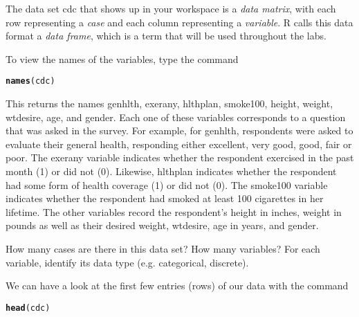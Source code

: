 \documentclass{article}\usepackage[]{graphicx}\usepackage[]{color}
\makeatletter
\newcommand{\hlstd}[1]{\textcolor[rgb]{0.345,0.345,0.345}{#1}}%
\newcommand{\hlkwd}[1]{\textcolor[rgb]{0.737,0.353,0.396}{\textbf{#1}}}%
\newenvironment{kframe}{%
 \def\at@end@of@kframe{}%
 \ifinner\ifhmode%
  \def\at@end@of@kframe{\end{minipage}}%
  \begin{minipage}{\columnwidth}%
 \fi\fi%
 \def\FrameCommand##1{\hskip\@totalleftmargin \hskip-\fboxsep
 \colorbox{shadecolor}{##1}\hskip-\fboxsep
     \hskip-\linewidth \hskip-\@totalleftmargin \hskip\columnwidth}%
 \MakeFramed {\advance\hsize-\width
   \@totalleftmargin\z@ \linewidth\hsize
   \@setminipage}}%
 {\par\unskip\endMakeFramed%
 \at@end@of@kframe}
\newenvironment{knitrout}{}{} %
\makeatother
\begin{document}
The data set \hlstd{cdc} that shows up in your workspace is a \emph{data matrix}, with each row representing a \emph{case} and each column representing a \emph{variable}.  R calls this data format a \emph{data frame}, which is a term that will be used throughout the labs.

To view the names of the variables, type the command

\begin{knitrout}
\color{fgcolor}\begin{kframe}
\begin{alltt}
\hlkwd{names}\hlstd{(cdc)}
\end{alltt}
\end{kframe}
\end{knitrout}


This returns the names \hlstd{genhlth}, \hlstd{exerany}, \hlstd{hlthplan}, \hlstd{smoke100}, \hlstd{height}, \hlstd{weight}, \hlstd{wtdesire}, \hlstd{age}, and \hlstd{gender}. Each one of these variables corresponds to a question that was asked in the survey.  For example, for \hlstd{genhlth}, respondents were asked to evaluate their general health, responding either excellent, very good, good, fair or poor. The \hlstd{exerany} variable indicates whether the respondent exercised in the past month (1) or did not (0). Likewise, \hlstd{hlthplan} indicates whether the respondent had some form of health coverage (1) or did not (0). The \hlstd{smoke100} variable indicates whether the respondent had smoked at least 100 cigarettes in her lifetime. The other variables record the respondent's \hlstd{height} in inches, \hlstd{weight} in pounds as well as their desired weight, \hlstd{wtdesire}, \hlstd{age} in years, and \hlstd{gender}.

\begin{exercise}
How many cases are there in this data set?  How many variables?  For each variable, identify its data type (e.g. categorical, discrete).
\end{exercise}

We can have a look at the first few entries (rows) of our data with the command

\begin{knitrout}
\color{fgcolor}\begin{kframe}
\begin{alltt}
\hlkwd{head}\hlstd{(cdc)}
\end{alltt}
\end{kframe}
\end{knitrout}
\end{document}
